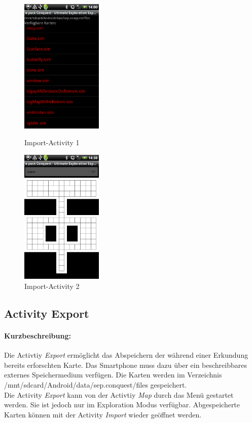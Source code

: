 \documentclass[10pt,a4paper]{article}
\begin{document}
			\begin{figure}[htbp]
				\begin{minipage}[t]{6.5cm}
					\vspace{0pt}
					\includegraphics[height=6.5cm]{images/import.png} 
					\caption{Import-Activity 1}
				\end{minipage}
				\hfill
				\begin{minipage}[t]{6.5cm}
					\vspace{0pt}
					\includegraphics[height=6.5cm]{images/import3.png} 
					\caption{Import-Activity 2}
				\end{minipage}
   			\end{figure} 	
 	\subsection{Activity Export}
 		\paragraph*{Kurzbeschreibung:}
 		Die Activtiy \textit{Export} ermöglicht das Abspeichern der während einer Erkundung bereits erforschten Karte. Das Smartphone muss dazu über
 		ein beschreibbares externes Speichermedium verfügen. Die Karten werden im Verzeichnis /mnt/sdcard/Android/data/sep.conquest/files
 		gespeichert. \\
 		Die Activity \textit{Export} kann von der Activtiy \textit{Map} durch das Menü gestartet werden. Sie ist jedoch nur im Exploration Modus
 		verfügbar. Abgespeicherte Karten können mit der Activity \textit{Import} wieder geöffnet werden.
 		
\end{document}
